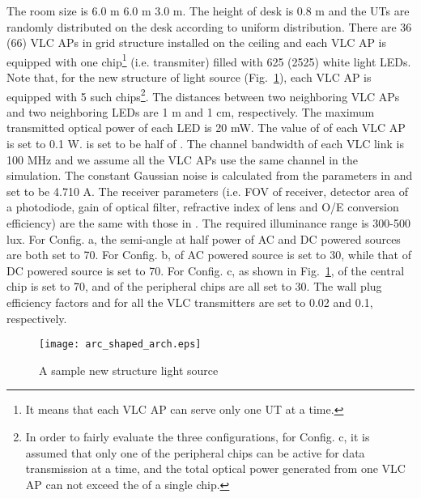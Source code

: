 \documentclass[10pt,journal]{IEEEtran}
\begin{document}
The room size is 6.0 m  6.0 m  3.0 m. The height of desk is 0.8 m and the UTs are randomly distributed on the desk according to uniform distribution. There are 36 (66) VLC APs in grid structure installed on the ceiling and each VLC AP is equipped with one chip\footnote{It means that each VLC AP can serve only one UT at a time.} (i.e. transmiter) filled with 625 (2525) white light LEDs. Note that, for the new structure of light source (Fig.~\ref{fig_acr_shaped_arch}), each VLC AP is equipped with 5 such chips\footnote{In order to fairly evaluate the three configurations, for Config. c, it is assumed that only one of the peripheral chips can be active for data transmission at a time, and the total optical power generated from one VLC AP can not exceed the  of a single chip.}. The distances between two neighboring VLC APs and two neighboring LEDs are 1 m and 1 cm, respectively. The maximum transmitted optical power of each LED is 20 mW. The value of  of each VLC AP is set to 0.1 W.  is set to be half of . The channel bandwidth of each VLC link is 100 MHz and we assume all the VLC APs use the same channel in the simulation. The constant Gaussian noise is calculated from the parameters in \cite {komine2004fundamental} and set to be 4.710 A. The receiver parameters (i.e. FOV of receiver, detector area of a photodiode, gain of optical filter, refractive index of lens and O/E conversion efficiency) are the same with those in \cite {komine2004fundamental}. The required illuminance range is 300-500 lux. For Config. a, the semi-angle at half power  of AC and DC powered sources are both set to 70. For Config. b,  of AC powered source is set to 30, while that of DC powered source is set to 70. For Config. c, as shown in Fig.~\ref{fig_acr_shaped_arch},  of the central chip is set to 70, and  of the peripheral chips are all set to 30. The wall plug efficiency factors  and  for all the VLC transmitters are set to 0.02 and 0.1, respectively.

\begin{figure}
\centering
\texttt{[image: arc\_shaped\_arch.eps]}
\caption{A sample new structure light source}
\label{fig_acr_shaped_arch}
\end{figure}
\end{document}
